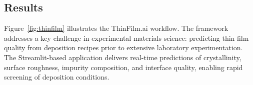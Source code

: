 
\subsection*{Results}

Figure~\ref{fig:thinfilm} illustrates the ThinFilm.ai workflow. The framework addresses a key challenge in experimental materials science: predicting thin film quality from deposition recipes prior to extensive laboratory experimentation. The Streamlit-based application delivers real-time predictions of crystallinity, surface roughness, impurity composition, and interface quality, enabling rapid screening of deposition conditions.


